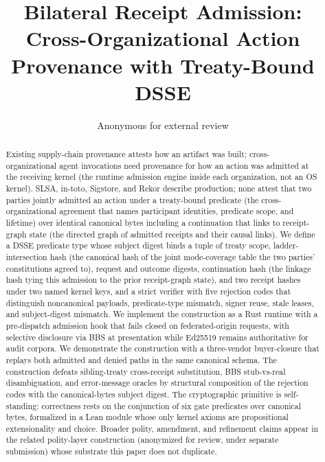 \documentclass[sigconf,anonymous,review,nonacm]{acmart}
\title{Bilateral Receipt Admission: Cross-Organizational Action Provenance with Treaty-Bound DSSE}
\author{Anonymous for external review}
\affiliation{\institution{Chio Project}}
\begin{document}
\begin{abstract}
Existing supply-chain provenance attests how an artifact was built; cross-organizational agent invocations need provenance for how an action was admitted at the receiving kernel (the runtime admission engine inside each organization, not an OS kernel). SLSA, in-toto, Sigstore, and Rekor describe production; none attest that two parties jointly admitted an action under a treaty-bound predicate (the cross-organizational agreement that names participant identities, predicate scope, and lifetime) over identical canonical bytes including a continuation that links to receipt-graph state (the directed graph of admitted receipts and their causal links). We define a DSSE predicate type whose subject digest binds a tuple of treaty scope, ladder-intersection hash (the canonical hash of the joint mode-coverage table the two parties' constitutions agreed to), request and outcome digests, continuation hash (the linkage hash tying this admission to the prior receipt-graph state), and two receipt hashes under two named kernel keys, and a strict verifier with five rejection codes that distinguish noncanonical payloads, predicate-type mismatch, signer reuse, stale leases, and subject-digest mismatch. We implement the construction as a Rust runtime with a pre-dispatch admission hook that fails closed on federated-origin requests, with selective disclosure via BBS at presentation while Ed25519 remains authoritative for audit corpora. We demonstrate the construction with a three-vendor buyer-closure that replays both admitted and denied paths in the same canonical schema. The construction defeats sibling-treaty cross-receipt substitution, BBS stub-vs-real disambiguation, and error-message oracles by structural composition of the rejection codes with the canonical-bytes subject digest. The cryptographic primitive is self-standing: correctness rests on the conjunction of six gate predicates over canonical bytes, formalized in a Lean module whose only kernel axioms are propositional extensionality and choice. Broader polity, amendment, and refinement claims appear in the related polity-layer construction (anonymized for review, under separate submission) whose substrate this paper does not duplicate.
\end{abstract}

\maketitle













\end{document}

